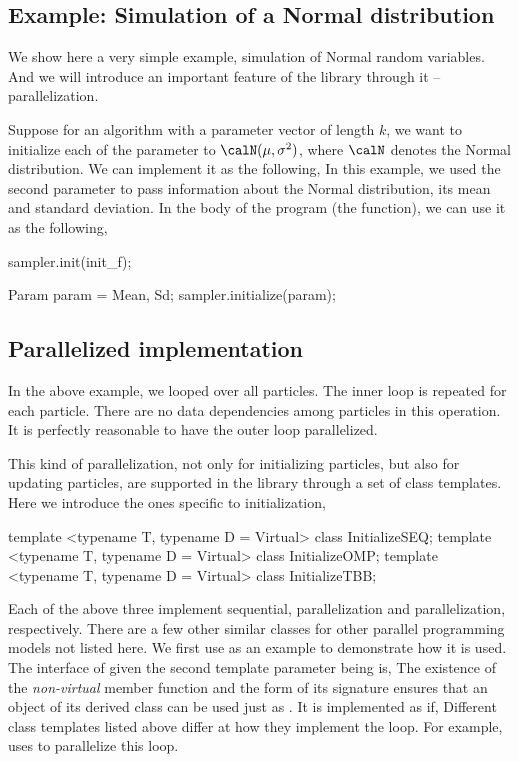 \subsection{Example: Simulation of a Normal distribution}
\label{sub:Example: Simulation of Normal distribution}

We show here a very simple example, simulation of Normal random variables. And we will introduce an important feature of the library through it -- parallelization.

Suppose for an \smc algorithm with a parameter vector of length $k$, we want to initialize each of the parameter to $\calN(\mu,\sigma^2)$, where $\calN$ denotes the Normal distribution. We can implement it as the following,
In this example, we used the second parameter  to pass information about the Normal distribution, its mean and standard deviation. In the body of the program (the  function), we can use it as the following,
\begin{cppcode}
sampler.init(init_f);

Param param = {Mean, Sd};
sampler.initialize(param);
\end{cppcode}

\subsection{Parallelized implementation}
\label{sub:Parallelized implementation}

In the above example, we looped over all particles. The inner loop is repeated for each particle. There are no data dependencies among particles in this operation. It is perfectly reasonable to have the outer loop parallelized.

This kind of parallelization, not only for initializing particles, but also for updating particles, are supported in the \vsmc library through a set of class templates. Here we introduce the ones specific to initialization,
\begin{cppcode}
template <typename T, typename D = Virtual> class InitializeSEQ;
template <typename T, typename D = Virtual> class InitializeOMP;
template <typename T, typename D = Virtual> class InitializeTBB;
\end{cppcode}
Each of the above three implement sequential, \openmp parallelization and \tbb parallelization, respectively. There are a few other similar classes for other parallel programming models not listed here. We first use  as an example to demonstrate how it is used. The interface of  given the second template parameter being  is,
The existence of the \emph{non-virtual} member function  and the form of its signature ensures that an object of its derived class can be used just as . It is implemented as if,
Different class templates listed above differ at how they implement the loop. For example,  uses \openmp to parallelize this loop.

